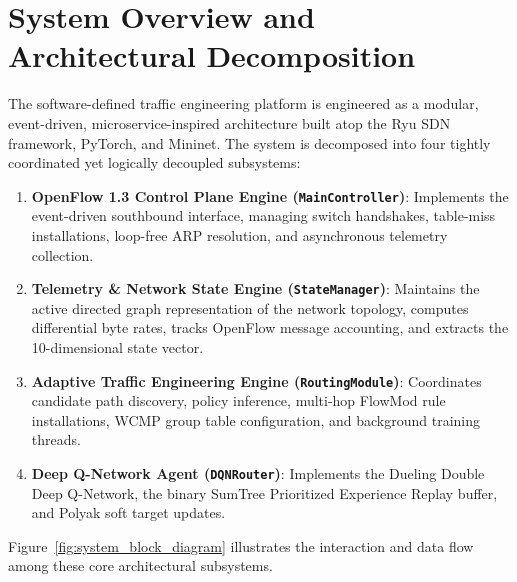 \documentclass[12pt,a4paper,oneside]{report}
\begin{document}
\section{System Overview and Architectural Decomposition}
The software-defined traffic engineering platform is engineered as a modular, event-driven, microservice-inspired architecture built atop the Ryu SDN framework, PyTorch, and Mininet. The system is decomposed into four tightly coordinated yet logically decoupled subsystems:
\begin{enumerate}
    \item \textbf{OpenFlow 1.3 Control Plane Engine (\texttt{MainController})}: Implements the event-driven southbound interface, managing switch handshakes, table-miss installations, loop-free ARP resolution, and asynchronous telemetry collection.
    \item \textbf{Telemetry \& Network State Engine (\texttt{StateManager})}: Maintains the active directed graph representation of the network topology, computes differential byte rates, tracks OpenFlow message accounting, and extracts the 10-dimensional state vector.
    \item \textbf{Adaptive Traffic Engineering Engine (\texttt{RoutingModule})}: Coordinates candidate path discovery, policy inference, multi-hop FlowMod rule installations, WCMP group table configuration, and background training threads.
    \item \textbf{Deep Q-Network Agent (\texttt{DQNRouter})}: Implements the Dueling Double Deep Q-Network, the binary SumTree Prioritized Experience Replay buffer, and Polyak soft target updates.
\end{enumerate}

Figure~\ref{fig:system_block_diagram} illustrates the interaction and data flow among these core architectural subsystems.
\end{document}
